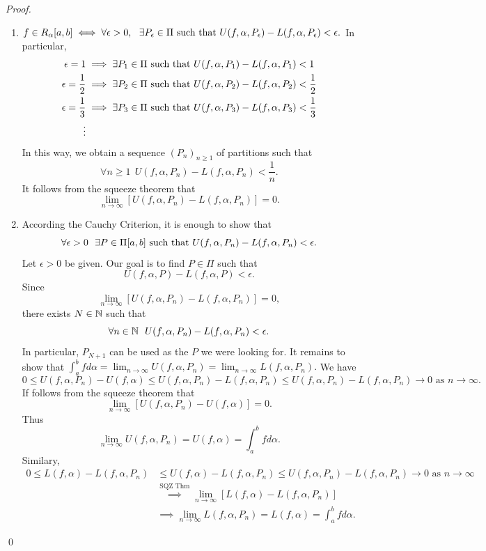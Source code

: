 \begin{proof}
    \begin{enumerate}
        \item $f \in R_\alpha [a,b] \iff \forall \epsilon > 0, ~~\exists P_\epsilon \in \Pi \text{ such that } U(f, \alpha, P_\epsilon) - L(f, \alpha, P_\epsilon) < \epsilon.$
        In particular, 
        \begin{align*}
            \epsilon = 1 &\implies \exists P_1 \in \Pi \text{ such that } U(f, \alpha, P_1) - L(f, \alpha, P_1) < 1 \\
            \epsilon = \frac{1}{2} &\implies \exists P_2 \in \Pi \text{ such that } U(f, \alpha, P_2) - L(f, \alpha, P_2) < \frac{1}{2} \\
            \epsilon = \frac{1}{3} &\implies \exists P_3 \in \Pi \text{ such that } U(f, \alpha, P_3) - L(f, \alpha, P_3) < \frac{1}{3} \\
            \vdots &
        \end{align*}
        In this way, we obtain a sequence $(P_n)_{n \geq 1}$ of partitions such that 
        $$\forall n \geq 1 ~~U(f, \alpha, P_n) - L(f, \alpha, P_n) < \frac{1}{n}.$$
        It follows from the squeeze theorem that 
        $$\lim_{n \to \infty}\left[U(f, \alpha, P_n) - L(f, \alpha, P_n)\right] = 0.$$

        \item According the Cauchy Criterion, it is enough to show that 
        $$\forall \epsilon > 0 ~~\exists P \in \Pi [a,b] \text{ such that } U(f, \alpha, P_n) - L(f, \alpha, P_n) < \epsilon.$$
        Let $\epsilon > 0$ be given. Our goal is to find $P \in \Pi$ such that
        $$U(f, \alpha, P) - L(f, \alpha, P) < \epsilon.$$
        Since
        $$\lim_{n\to \infty} \left[U(f, \alpha, P_n) - L(f, \alpha, P_n)\right] = 0,$$
        there exists $N \in \mathbb{N}$ such that 
        $$\forall n \in \mathbb{N} ~~U(f, \alpha, P_n) - L(f, \alpha, P_n) < \epsilon.$$
        In particular, $P_{N+1}$ can be used as the $P$ we were looking for. It remains to show that $\int_a^b f d\alpha = \lim_{n \to \infty} U(f, \alpha, P_n) = \lim_{n \to \infty} L(f, \alpha, P_n).$ We have
        $$0 \leq U(f, \alpha, P_n) - U(f, \alpha) \leq U(f, \alpha, P_n) - L(f, \alpha, P_n) \leq U(f, \alpha, P_n) - L(f, \alpha, P_n) \to 0 \text{ as } n\to \infty.$$
        If follows from the squeeze theorem that 
        $$\lim_{n\to \infty} [U(f, \alpha, P_n) - U(f, \alpha)] = 0.$$
        Thus
        $$\lim_{n \to \infty} U(f, \alpha, P_n) = U(f, \alpha) = \int_a^b f d \alpha.$$
        Similary,
        \begin{align*}
            0 \leq L(f, \alpha) - L(f, \alpha, P_n) & \leq U(f, \alpha) - L(f, \alpha, P_n) \leq U(f, \alpha, P_n) - L(f, \alpha, P_n) \to 0 \text{ as } n\to \infty \\
            &\overset{\text{SQZ Thm}}{\implies} \lim_{n \to \infty} \left[L(f, \alpha) - L(f, \alpha, P_n)\right] \\
            &\implies \lim_{n \to \infty} L(f, \alpha, P_n) = L(f, \alpha) = \int_a^b f d\alpha.
        \end{align*}
    \end{enumerate}
    \qed
\end{proof}

